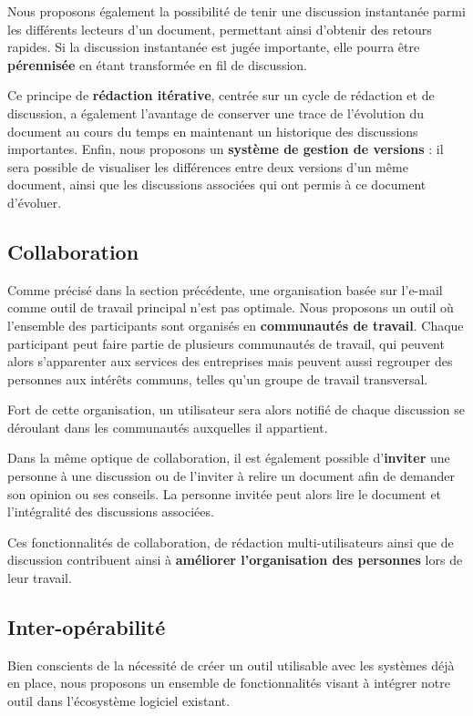 \documentclass[10pt,twocolumn,a4paper,utf8x]{article}
\begin{document}
Nous proposons également la possibilité de tenir une discussion
instantanée parmi les différents lecteurs d'un document, permettant
ainsi d'obtenir des retours rapides. Si la discussion instantanée est
jugée importante, elle pourra être \textbf{pérennisée} en étant
transformée en fil de discussion.

Ce principe de \textbf{rédaction itérative}, centrée sur un cycle de
rédaction et de discussion, a également l'avantage de conserver une
trace de l'évolution du document au cours du temps en maintenant un
historique des discussions importantes. Enfin, nous proposons un
\textbf{système de gestion de versions} : il sera possible de visualiser
les différences entre deux versions d'un même document, ainsi que les
discussions associées qui ont permis à ce document d'évoluer.

\subsection{Collaboration}

Comme précisé dans la section précédente, une organisation basée sur
l'e-mail comme outil de travail principal n'est pas optimale. Nous
proposons un outil où l'ensemble des participants sont organisés en
\textbf{communautés de travail}. Chaque participant peut faire partie de
plusieurs communautés de travail, qui peuvent alors s'apparenter aux
services des entreprises mais peuvent aussi regrouper des personnes aux
intérêts communs, telles qu'un groupe de travail transversal.

Fort de cette organisation, un utilisateur sera alors notifié de chaque
discussion se déroulant dans les communautés auxquelles il appartient.

Dans la même optique de collaboration, il est également possible
d'\textbf{inviter} une personne à une discussion ou de l'inviter à
relire un document afin de demander son opinion ou ses conseils. La
personne invitée peut alors lire le document et l'intégralité des
discussions associées.

Ces fonctionnalités de collaboration, de rédaction multi-utilisateurs
ainsi que de discussion contribuent ainsi à \textbf{améliorer
l'organisation des personnes} lors de leur travail.

\subsection{Inter-opérabilité}

Bien conscients de la nécessité de créer un outil utilisable avec les
systèmes déjà en place, nous proposons un ensemble de fonctionnalités
visant à intégrer notre outil dans l'écosystème logiciel existant.
\end{document}
